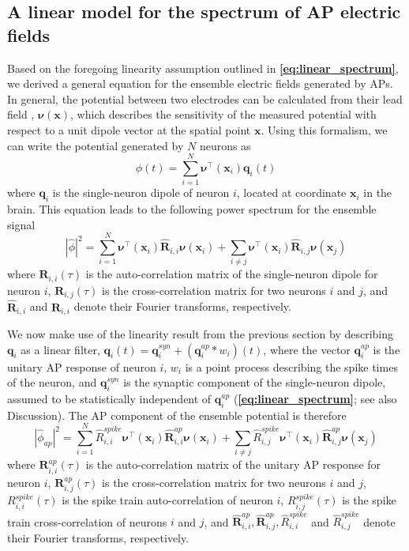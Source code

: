 \subsection{A linear model for the spectrum of AP electric fields}
Based on the foregoing linearity assumption outlined in \textbf{\ref{eq:linear_spectrum}}, we derived a general equation for the ensemble electric fields generated by APs. In general, the potential between two electrodes can be calculated from their lead field \cite{Malmivuo1995}, $\bm{\nu}(\bm{x})$, which describes the sensitivity of the measured potential with respect to a unit dipole vector at the spatial point $\bm{x}$. Using this formalism, we can write the potential generated by $N$ neurons as 
\begin{equation}
    \phi(t) = \sum_{i=1}^N \bm{\nu}^\intercal(\bm{x}_i) \bm{q}_i(t)
\end{equation}
where $\bm{q}_i$ is the single-neuron dipole of neuron $i$, located at coordinate $\bm{x}_i$ in the brain. This equation leads to the following power spectrum for the ensemble signal
\begin{equation} \label{eq:apEEG_spectrum}
    |\hat{\phi}|^2 = \sum_{i=1}^N \bm{\nu}^\intercal(\bm{x}_i) \hat{\bm{R}}_{i,i} \bm{\nu}(\bm{x}_i) + \sum_{i\ne j} \bm{\nu}^\intercal(\bm{x}_i) \hat{\bm{R}}_{i,j}\bm{\nu}(\bm{x}_j)
\end{equation}
where $\bm{R}_{i,i}(\tau)$ is the auto-correlation matrix of the single-neuron dipole for neuron $i$, $\bm{R}_{i,j}(\tau)$ is the cross-correlation matrix for two neurons $i$ and $j$, and $\hat{\bm{R}}_{i,i}$ and $\hat{\bm{R}}_{i,i}$ denote their Fourier transforms, respectively.

We now make use of the linearity result from the previous section by describing $\bm{q}_i$ as a linear filter, $\bm{q}_i(t)=\bm{q}_i^{syn}+(\bm{q}^{ap}_i*w_i)(t)$, where the vector $\bm{q}^{ap}_i$ is the unitary AP response of neuron $i$, $w_i$ is a point process describing the spike times of the neuron, and $\bm{q}^{syn}_i$ is the synaptic component of the single-neuron dipole, assumed to be statistically independent of $\bm{q}^{ap}_i$ (\textbf{\ref{eq:linear_spectrum}}; see also Discussion). The AP component of the ensemble potential is therefore
\begin{equation} \label{eq:apEEG_spectrum2}
    |\hat{\phi}_{ap}|^2 = \sum_{i=1}^N \hat{R}_{i,i}^{spike} \bm{\nu}^\intercal(\bm{x}_i) \hat{\bm{R}}^{ap}_{i,i} \bm{\nu}(\bm{x}_i) + \sum_{i\ne j} \hat{R}^{spike}_{i,j}\bm{\nu}^\intercal(\bm{x}_i) \hat{\bm{R}}^{ap}_{i,j}\bm{\nu}(\bm{x}_j)
\end{equation}
where $\bm{R}^{ap}_{i,i}(\tau)$ is the auto-correlation matrix of the unitary AP response for neuron $i$, $\bm{R}^{ap}_{i,j}(\tau)$ is the cross-correlation matrix for two neurons $i$ and $j$, $R_{i,i}^{spike}(\tau)$ is the spike train auto-correlation of neuron $i$, $R_{i,j}^{spike}(\tau)$ is the spike train cross-correlation of neurons $i$ and $j$, and $\hat{\bm{R}}^{ap}_{i,i}, \hat{\bm{R}}^{ap}_{i,j}, \hat{R}_{i,i}^{spike}$ and $\hat{R}^{spike}_{i,j}$ denote their Fourier transforms, respectively.

